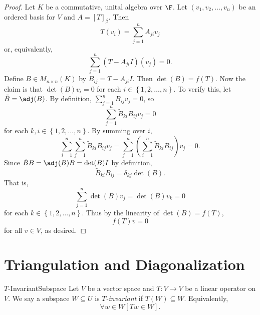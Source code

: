 \documentclass[linearalgebra]{subfiles}
\begin{document}
    \begin{proof}
        Let $K$ be a commutative, unital algebra over $\F$. Let $\left( v_1, v_2, \ldots, v_n \right)$ be an ordered basis for $V$ and $A = \left[ T \right]_\beta$. Then
        \begin{equation*}
            T(v_i) = \sum^{n}_{j=1} A_{ji}v_j
        \end{equation*} 
        or, equivalently,
        \begin{equation*}
            \sum^{n}_{j=1} \left( T - A_{ji}I \right) (v_j) = 0.
        \end{equation*}
        Define $B\in M_{n\times n}(K)$ by $B_{ij} = T - A_{ji}I$. Then $\det(B) = f(T)$. Now the claim is that $\det(B)v_i = 0$ for each $i\in \left\lbrace 1, 2, \ldots, n \right\rbrace$. To verify this, let $\tilde{B} = \adj(B)$. By definition, $\sum^{n}_{j=1} B_{ij}v_j = 0$, so
        \begin{equation*}
            \sum^{n}_{j=1} \tilde{B}_{ki} B_{ij} v_j = 0
        \end{equation*}
        for each $k, i\in \left\lbrace 1, 2, \ldots, n \right\rbrace$. By summing over $i$,
        \begin{equation*}
            \sum^{n}_{i=1} \sum^{n}_{j=1} \tilde{B}_{ki}B_{ij}v_j = \sum^{n}_{j=1} \left( \sum^{n}_{i=1} \tilde{B}_{ki} B_{ij} \right) v_j = 0. 
        \end{equation*}
        Since $\tilde{B}B = \adj(B)B = \det(B)I$ by definition,
        \begin{equation*}
            \tilde{B}_{ki}B_{ij} = \delta_{kj}\det(B).
        \end{equation*}
        That is,
        \begin{equation*}
            \sum^{n}_{j=1} \det(B)v_j = \det(B)v_k = 0
        \end{equation*}
        for each $k\in \left\lbrace 1, 2, \ldots, n \right\rbrace$. Thus by the linearity of $\det(B) = f(T)$,
        \begin{equation*}
            f(T)v = 0
        \end{equation*}
        for all $v\in V$, as desired.
    \end{proof}
    
    \section{Triangulation and Diagonalization}

    \begin{definition}{$T$-Invariant}{Subspace}
        Let $V$ be a vector space and $T:V\to V$ be a linear operator on $V$. We say a subspace $W\subseteq U$ is \emph{$T$-invariant} if $T(W)\subseteq W$. Equivalently,
        \begin{equation*}
            \forall w\in W \left[ Tw\in W \right].
        \end{equation*}
    \end{definition}
\end{document}
